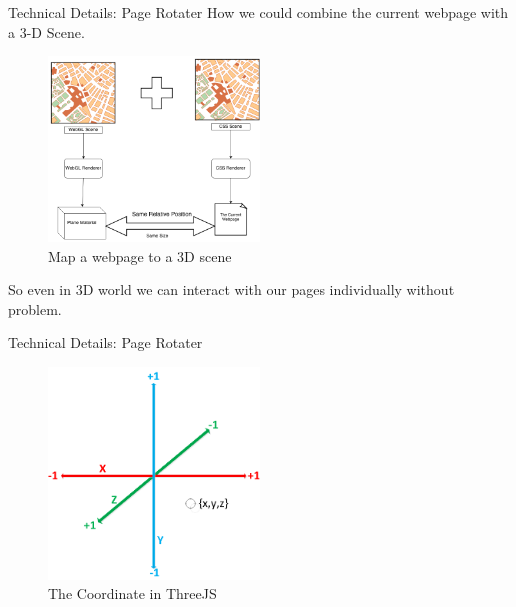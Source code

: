\documentclass{beamer}
\begin{document}
\begin{frame}{Technical Details: Page Rotater}
How we could combine the current webpage with a 3-D Scene.
\begin{center}
    \begin{figure}
        \includegraphics[width=0.5\textwidth]{./images/css3d.png}
        \caption{Map a webpage to a 3D scene}
    \end{figure}
\end{center}
So even in 3D world we can interact with our pages individually without problem.
\end{frame}

\begin{frame}{Technical Details: Page Rotater}
\begin{center}
    \begin{figure}
        \includegraphics[width=0.5\textwidth]{./images/threejs_corodinate.png}
        \caption{The Coordinate in ThreeJS}
    \end{figure}
\end{center}
\end{frame}
\end{document}
